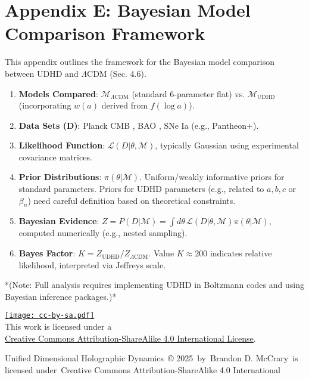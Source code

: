 \documentclass[12pt, a4paper]{article} %
\newcommand{\cclicense}{%
\begin{center}
\vspace{1em}
\footnotesize
\href{https://creativecommons.org/licenses/by-sa/4.0/}{\texttt{[image: cc-by-sa.pdf]}} \\ %
This work is licensed under a \\
\href{https://creativecommons.org/licenses/by-sa/4.0/}{Creative Commons Attribution-ShareAlike 4.0 International License}. \\
\vspace{1em}
\end{center}
}
\begin{document}
\section{Appendix E: Bayesian Model Comparison Framework}
\label{app:bayesian}
This appendix outlines the framework for the Bayesian model comparison between UDHD and \(\Lambda\)CDM (Sec. 4.6).
\begin{enumerate}
    \item \textbf{Models Compared}: \(\mathcal{M}_{\Lambda\text{CDM}}\) (standard 6-parameter flat) vs. \(\mathcal{M}_{\text{UDHD}}\) (incorporating \(w(a)\) derived from \(f(\log a)\)).
    \item \textbf{Data Sets (D)}: Planck CMB \cite{planck2020parameters}, BAO \cite{desi2024bao}, SNe Ia (e.g., Pantheon+).
    \item \textbf{Likelihood Function}: \( \mathcal{L}(D | \theta, \mathcal{M}) \), typically Gaussian using experimental covariance matrices.
    \item \textbf{Prior Distributions}: \( \pi(\theta | \mathcal{M}) \). Uniform/weakly informative priors for standard parameters. Priors for UDHD parameters (e.g., related to \(a,b,c\) or \( \beta_n \)) need careful definition based on theoretical constraints.
    \item \textbf{Bayesian Evidence}: \( Z = P(D | \mathcal{M}) = \int d\theta \, \mathcal{L}(D | \theta, \mathcal{M}) \pi(\theta | \mathcal{M}) \), computed numerically (e.g., nested sampling).
    \item \textbf{Bayes Factor}: \( K = Z_{\text{UDHD}} / Z_{\Lambda\text{CDM}} \). Value \( K \approx 200 \) indicates relative likelihood, interpreted via Jeffreys scale.
\end{enumerate}
*(Note: Full analysis requires implementing UDHD in Boltzmann codes and using Bayesian inference packages.)*


\cclicense{Unified Dimensional Holographic Dynamics © 2025 by Brandon D. McCrary is licensed under Creative Commons Attribution-ShareAlike 4.0 International}
\end{document}

